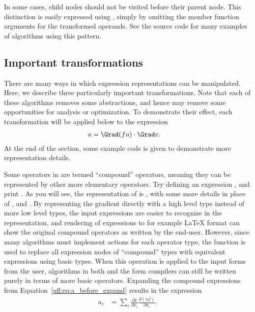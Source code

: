 In some cases, child nodes should not be visited before their parent
node. This distinction is easily expressed using ,
simply by omitting the member function arguments for the transformed
operands. See the source code for many examples of algorithms using
this pattern.

\vspace*{-1.5pt}
\subsection{Important transformations} \label{ufl:sec:expanding}

There are many ways in which expression representations can
be manipulated.  Here, we describe three particularly important
transformations.  Note that each of these algorithms removes some
abstractions, and hence may remove some opportunities for analysis or
optimization. To demonstrate their effect, each transformation will be
applied below to the expression
\begin{align} \label{ufl:eq:a_before_expand}
a   &= \Grad (f u) \cdot \Grad v.
\end{align}
At the end of the section, some example code is given to demonstrate
more representation details.

Some operators in \ufl{} are termed ``compound'' operators, meaning they
can be represented by other more elementary operators.  Try defining an
expression , and print . As
you will see, the representation of  is , with some more details in place of , 
and .  By representing the gradient directly with a high level
type  instead of more low level types, the input expressions are
easier to recognize in the representation, and rendering of expressions to
for example \LaTeX{} format can show the original compound operators as
written by the end-user.  However, since many algorithms must implement
actions for each operator type, the function  is
used to replace all expression nodes of ``compound'' types with equivalent
expressions using basic types. When this operation is applied to the input
forms from the user, algorithms in both \ufl{} and the form compilers
can still be written purely in terms of more basic operators.  Expanding
the compound expressions from Equation~\eqref{ufl:eq:a_before_expand}
results in the expression
\begin{align} \label{ufl:eq:a_after_expand_compounds}
a_c &= \sum_i \frac{\partial v}{\partial x_i} \frac{\partial (u f)}{\partial x_i}.
\end{align}

